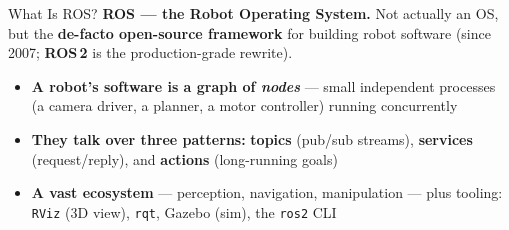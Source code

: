 \documentclass[9pt]{beamer}
\begin{document}
\begin{frame}{What Is ROS?}
  \textbf{ROS --- the Robot Operating System.} Not actually an OS, but the \textbf{de-facto open-source framework} for building robot software (since 2007; \textbf{ROS\,2} is the production-grade rewrite).

  \vspace{0.5em}
  \begin{itemize}
    \item \textbf{A robot's software is a graph of \emph{nodes}} --- small independent processes (a camera driver, a planner, a motor controller) running concurrently
    \item \textbf{They talk over three patterns:} \textbf{topics} (pub/sub streams), \textbf{services} (request/reply), and \textbf{actions} (long-running goals)
    \item \textbf{A vast ecosystem} --- perception, navigation, manipulation --- plus tooling: \texttt{RViz} (3D view), \texttt{rqt}, Gazebo (sim), the \texttt{ros2} CLI
  \end{itemize}
\end{frame}
\end{document}
